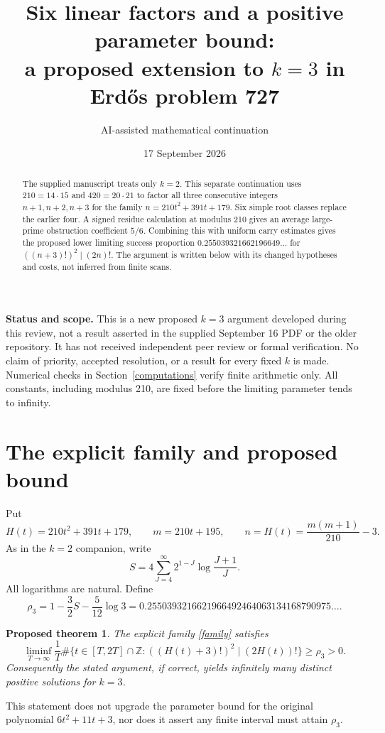 \documentclass[11pt]{article}
\title{Six linear factors and a positive parameter bound:\\a proposed extension to $k=3$ in Erd\H{o}s problem 727}
\author{AI-assisted mathematical continuation}
\date{17 September 2026}
\newtheorem{theorem}{Proposed theorem}
\begin{document}
\maketitle
\begin{abstract}
The supplied manuscript treats only $k=2$. This separate continuation uses
$210=14\cdot15$ and $420=20\cdot21$ to factor all three consecutive integers
$n+1,n+2,n+3$ for the family $n=210t^2+391t+179$. Six simple root classes replace
the earlier four. A signed residue calculation at modulus 210 gives an average
large-prime obstruction coefficient $5/6$. Combining this with uniform carry
estimates gives the proposed lower limiting success proportion
$0.255039321662196649\ldots$ for $((n+3)!)^2\mid(2n)!$. The argument is written
below with its changed hypotheses and costs, not inferred from finite scans.
\end{abstract}
\textbf{Status and scope.} This is a new proposed $k=3$ argument developed during
this review, not a result asserted in the supplied September 16 PDF or the older
repository. It has not received independent peer review or formal verification.
No claim of priority, accepted resolution, or a result for every fixed $k$ is
made. Numerical checks in Section~\ref{computations} verify finite arithmetic
only. All constants, including modulus 210, are fixed before the limiting
parameter tends to infinity.

\section{The explicit family and proposed bound}
Put
\begin{equation}\label{family}
 H(t)=210t^2+391t+179,\qquad m=210t+195,\qquad n=H(t)=\frac{m(m+1)}{210}-3.
\end{equation}
As in the $k=2$ companion, write
\begin{equation}\label{S}
 S=4\sum_{J=4}^{\infty}2^{1-J}\log\frac{J+1}{J}.
\end{equation}
All logarithms are natural. Define
\begin{equation}\label{rho}
 \rho_3=1-\frac32 S-\frac5{12}\log3
       =0.2550393216621966492464063134168790975\ldots .
\end{equation}
\begin{theorem}\label{main}
The explicit family \eqref{family} satisfies
\begin{equation}\label{bound}
 \liminf_{T\to\infty}\frac1T
 \#\{t\in[T,2T]\cap\mathbb Z:((H(t)+3)!)^2\mid(2H(t))!\}\ge\rho_3>0.
\end{equation}
Consequently the stated argument, if correct, yields infinitely many distinct
positive solutions for $k=3$.
\end{theorem}
This statement does not upgrade the parameter bound for the original polynomial
$6t^2+11t+3$, nor does it assert any finite interval must attain $\rho_3$.
\end{document}
